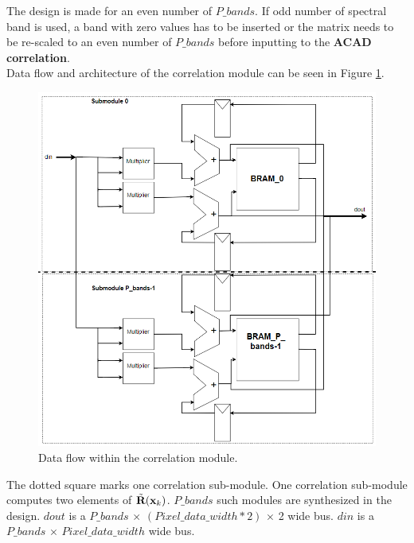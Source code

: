 
The design is made for an even number of $P\_bands$. If odd number of spectral band is used, a band with zero values has to be inserted or the matrix needs to be re-scaled to an even number of $P\_bands$ before inputting to the \textbf{ACAD correlation}.\\


Data flow and architecture of the correlation module can be seen in Figure \ref{fig:data_flow_correlation}. 


\begin{figure}[H]
\centering
   \includegraphics[scale=0.4]{images/correlation_data_path.PNG}
  \caption{Data flow within the correlation module.  } 
  \label{fig:data_flow_correlation}
\end{figure}

The dotted square marks one correlation sub-module. One correlation sub-module computes two elements of $\Tilde{\textbf{R}}(\textbf{x}_k)$.  $P\_bands$ such modules are synthesized in the design. $dout$ is a $P\_bands$ $\times$
$(Pixel\_data\_width*2)$ $\times$ 2 wide bus. $din$ is a $P\_bands$ $\times$
$Pixel\_data\_width$ wide bus.





